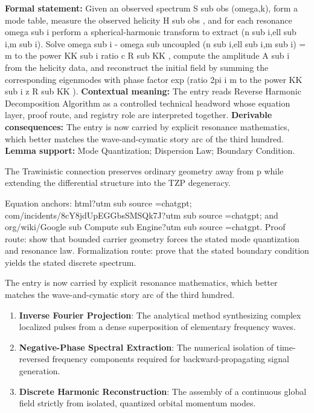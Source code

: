\begingroup\footnotesize\setlength{\emergencystretch}{3em}\sloppy
\textbf{Formal statement:} Given an observed spectrum S sub obs (omega,k), form a mode table, measure the observed helicity H sub obs , and for each resonance omega sub i perform a spherical-harmonic transform to extract (n sub i,ell sub i,m sub i). Solve omega sub i - omega sub uncoupled (n sub i,ell sub i,m sub i) = m to the power KK sub i ratio c R sub KK , compute the amplitude A sub i from the helicity data, and reconstruct the initial field by summing the corresponding eigenmodes with phase factor exp (ratio 2pi i m to the power KK sub i z R sub KK ). \textbf{Contextual meaning:} The entry reads Reverse Harmonic Decomposition Algorithm as a controlled technical headword whose equation layer, proof route, and registry role are interpreted together. \textbf{Derivable consequences:} The entry is now carried by explicit resonance mathematics, which better matches the wave-and-cymatic story arc of the third hundred. \textbf{Lemma support:} Mode Quantization; Dispersion Law; Boundary Condition.\par
\endgroup

The Trawinistic connection preserves ordinary geometry away from p while extending the differential structure into the TZP degeneracy.

Equation anchors: html?utm sub source =chatgpt; com/incidents/8cY8jdUpEGGbsSMSQk7J?utm sub source =chatgpt; and org/wiki/Google sub Compute sub Engine?utm sub source =chatgpt. Proof route: show that bounded carrier geometry forces the stated mode quantization and resonance law. Formalization route: prove that the stated boundary condition yields the stated discrete spectrum.

The entry is now carried by explicit resonance mathematics, which better matches the wave-and-cymatic story arc of the third hundred.
\endgroup

\begin{enumerate}[leftmargin=1.6em,itemsep=6pt,topsep=4pt]
\item \textbf{Inverse Fourier Projection}: The analytical method synthesizing complex localized pulses from a dense superposition of elementary frequency waves.
\item \textbf{Negative-Phase Spectral Extraction}: The numerical isolation of time-reversed frequency components required for backward-propagating signal generation.
\item \textbf{Discrete Harmonic Reconstruction}: The assembly of a continuous global field strictly from isolated, quantized orbital momentum modes.
\end{enumerate}

